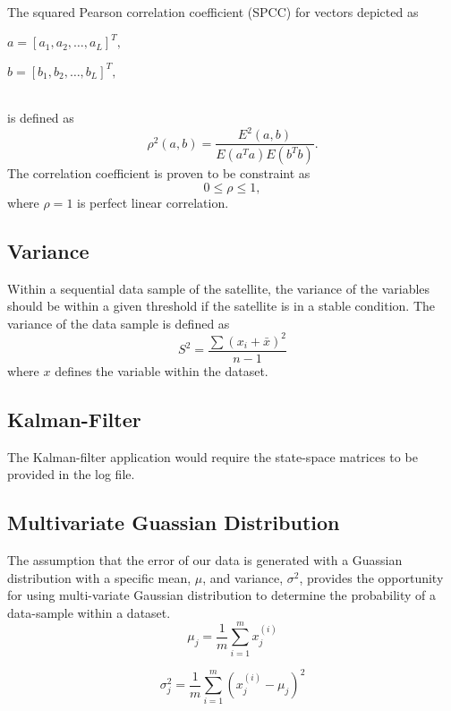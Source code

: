 The squared Pearson correlation coefficient (SPCC) for vectors depicted as
\linebreak
\\
\centerline{$a = [a_1, a_2, \ldots, a_L]^T,$}
\linebreak
\centerline{$b = [b_1, b_2, \ldots, b_L]^T,$}
\\
is defined as \cite{benesty2009pearson}
\begin{equation}
\rho^2 (a,b) = \frac{E^2 (a,b)}{E(a^Ta)E(b^Tb)}.
\end{equation}
The correlation coefficient is proven to be constraint as
\begin{equation}
0 \leq \rho \leq 1,
\end{equation}
where $\rho = 1$ is perfect linear correlation. 

\subsection{Variance}
Within a sequential data sample of the satellite, the variance of the variables should be within a given threshold if the satellite is in a stable condition. The variance of the data sample is defined as 
\begin{equation}
	S^2 = \frac{\sum(x_i + \bar{x})^2}{n-1}
\end{equation}
where $x$ defines the variable within the dataset.

\subsection{Kalman-Filter}
The Kalman-filter application would require the state-space matrices to be provided in the log file.

\subsection{Multivariate Guassian Distribution}
The assumption that the error of our data is generated with a Guassian distribution with a specific mean, $\mu$, and variance, $\sigma^2$, provides the opportunity for using multi-variate Gaussian distribution to determine the probability of a data-sample within a dataset. 
\begin{equation}
	\label{mean}
	\mu_j = \frac{1}{m} \sum_{i=1}^{m}x_j^{(i)}
\end{equation}

\begin{equation}
\label{variance}
\sigma_j^2 = \frac{1}{m} \sum_{i=1}^{m}(x_j^{(i)} - \mu_j)^2
\end{equation}


